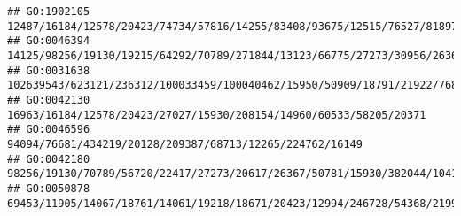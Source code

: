 \documentclass[
]{article}
\begin{document}
\begin{verbatim}
## GO:1902105                                                                                                                                                                                                                                                  12487/16184/12578/20423/74734/57816/14255/83408/93675/12515/76527/81897/67596/16160/20304/12775/13386/21943/75766/57757/15001/14998/14960/16149/20371/16186
## GO:0046394                                                                                                                                                                                                                                                        14125/98256/19130/19215/64292/70789/271844/13123/66775/27273/30956/26367/20216/15930/382044/104158/13897/11808/66113/103142/209027/71275/268756/16149
## GO:0031638                                                                                                                                                                                                                                                                                                                              102639543/623121/236312/100033459/100040462/15950/50909/18791/21922/76884/30060
## GO:0042130                                                                                                                                                                                                                                                                                                                                           16963/16184/12578/20423/27027/15930/208154/14960/60533/58205/20371
## GO:0046596                                                                                                                                                                                                                                                                                                                                                     94094/76681/434219/20128/209387/68713/12265/224762/16149
## GO:0042180                                                                                                                                                                                                                                                                           98256/19130/70789/56720/22417/27273/20617/26367/50781/15930/382044/104158/13897/56857/11808/66113/103142/105387/58226/631304/16149
## GO:0050878                                                                                                                                                                                                                                          69453/11905/14067/18761/14061/19218/18671/20423/12994/246728/54368/21990/27027/18791/234199/20443/20533/217369/107849/14165/15117/71753/22337/15160/100503895/11551

\end{verbatim}
\end{document}

